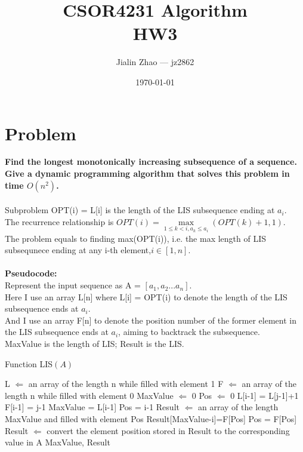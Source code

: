 \documentclass{article}
\title{CSOR4231 Algorithm\\HW3}
\author{Jialin Zhao --- jz2862}
\date{\today}
\begin{document}
 
\maketitle{} 
\section{Problem \uppercase\expandafter{}} 
\textbf{Find the longest monotonically increasing subsequence of a sequence.\\ Give a dynamic programming algorithm that solves this problem in time $O(n^2)$.\\\\}
Subproblem OPT(i) = L[i] is the length of the LIS subsequence ending at $a_i$.\\
The recurrence relationship is $OPT(i) = \max\limits_{1\le k<i,a_k\le a_i}(OPT(k)+1,1)$.\\
The problem equals to finding max(OPT(i)), i.e. the max length of LIS subsequnece ending at any i-th element,$i \in [1,n]$.\\\\
\textbf{\large Pseudocode:\\}
Represent the input sequence as A = $[a_1,a_2...a_n]$.\\
Here I use an array L[n] where L[i] = OPT(i) to denote the length of the LIS subsequence ends at $a_i$.\\
And I use an array F[n] to denote the position number of the former element in the LIS subsequence ends at $a_i$, aiming to backtrack the subsequence.\\
MaxValue is the length of LIS; Result is the LIS.\\
\begin{algorithm}[H]
  \caption{Function LIS$(A)$}
  \label{alg1}
  \begin{algorithmic}
  \STATE L $\Longleftarrow$ an array of the length n while filled with element 1
  \STATE F $\Longleftarrow$ an array of the length n while filled with element 0
  \STATE MaxValue $\Longleftarrow$ 0
  \STATE Pos $\Longleftarrow$ 0
  \STATE L[i-1] = L[j-1]+1
  \STATE F[i-1] = j-1
  \ENDIF
  \ENDIF
  \ENDFOR
  \STATE MaxValue = L[i-1]
  \STATE Pos = i-1
  \ENDIF
  \ENDFOR
  \STATE Result $\Longleftarrow$ an array of the length MaxValue and filled with element Pos
  \STATE Result[MaxValue-i]=F[Pos]
  \STATE Pos = F[Pos]
  \ENDFOR
  \STATE Result $\Longleftarrow$ convert the element position stored in Result to the corresponding value in A
  \RETURN MaxValue, Result
  \end{algorithmic}
\end{algorithm}
\end{document}
